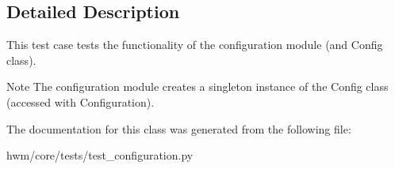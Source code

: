 \subsection{Detailed Description}
This test case tests the functionality of the configuration module (and Config class). 

\begin{DoxyNote}{Note}
The configuration module creates a singleton instance of the Config class (accessed with Configuration). 
\end{DoxyNote}


The documentation for this class was generated from the following file\-:\begin{DoxyCompactItemize}
\item 
hwm/core/tests/test\-\_\-configuration.\-py\end{DoxyCompactItemize}
